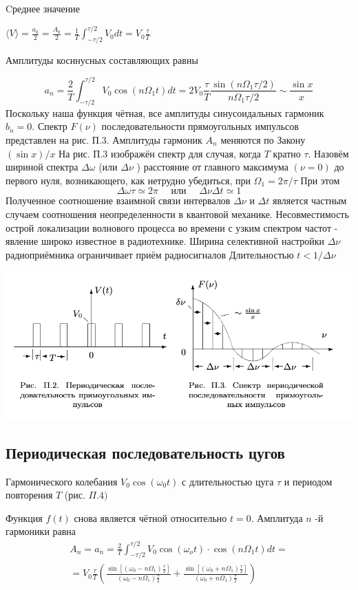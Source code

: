 \documentclass[a4paper, 12pt]{article}%
\begin{document}
Cреднее значение

$\langle V\rangle=\frac{a_{0}}{2}=\frac{A_{0}}{2}=\frac{1}{T} \int_{-\tau / 2}^{\tau / 2} V_{0} d t=V_{0} \frac{\tau}{T}$

Амплитуды косинусных составляющих равны

$$
a_{n}=\frac{2}{T} \int_{-\tau / 2}^{\tau / 2} V_{0} \cos \left(n \Omega_{1} t\right) d t=2 V_{0} \frac{\tau}{T} \frac{\sin \left(n \Omega_{1} \tau / 2\right)}{n \Omega_{1} \tau / 2} \sim \frac{\sin x}{x}
$$
Поскольку наша функция чётная, все амплитуды синусоидальных гармоник $b_{n}=0 .$ Спектр $F(\nu)$ последовательности прямоугольных импульсов представлен на рис. П.3. Амплитуды гармоник $A_{n}$ меняются по Закону $(\sin x) / x$
На рис. П.3 изображён спектр для случая, когда $T$ кратно $\tau .$ Назовём шириной спектра $\Delta \omega$ (или $\Delta \nu$ ) расстояние от главного максимума $(\nu=0)$ до первого нуля, возникающего, как нетрудно убедиться, при $\Omega_{1}=2 \pi / \tau$ При этом
$$
\Delta \omega \tau \simeq 2 \pi \quad \text { или } \quad \Delta \nu \Delta t \simeq 1
$$
Полученное соотношение взаимной связи интервалов $\Delta \nu$ и $\Delta t$ является
частным случаем соотношения неопределенности в квантовой механике. Несовместимость острой локализации волнового процесса во времени с узким спектром частот - явление широко известное в радиотехнике. Ширина селективной настройки $\Delta \nu$ радиоприёмника ограничивает приём радиосигналов Длительностью $t<1 / \Delta \nu$

 \begin{center}
\includegraphics[width=0.7\linewidth]{./anat/2.jpg}\\
\end{center}

\subsection{Периодическая последовательность цугов}
Гармонического колебания $V_{0} \cos \left(\omega_{0} t\right)$ с длительностью цуга $\tau$ и периодом повторения $T$ (рис. $\Pi .4)$
 
Функция $f(t)$ снова является чётной относительно $t=0 .$ Амплитуда $n$ -й гармоники равна
$$
\begin{array}{c}
A_{n}=a_{n}=\frac{2}{T} \int_{-\tau / 2}^{\tau / 2} V_{0} \cos \left(\omega_{o} t\right) \cdot \cos \left(n \Omega_{1} t\right) d t= \\
=V_{0} \frac{\tau}{T}\left(\frac{\sin \left[\left(\omega_{0}-n \Omega_{1}\right) \frac{\tau}{2}\right]}{\left(\omega_{0}-n \Omega_{1}\right) \frac{\tau}{2}}+\frac{\sin \left[\left(\omega_{0}+n \Omega_{1}\right) \frac{\tau}{2}\right]}{\left(\omega_{0}+n \Omega_{1}\right) \frac{\tau}{2}}\right)
\end{array}
$$
\end{document}
